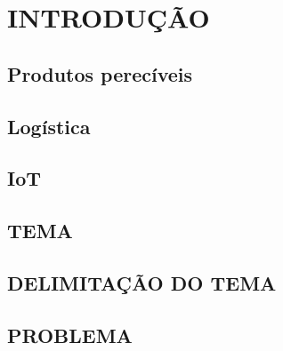 \chapter{INTRODUÇÃO}\label{cap:introducao}


\section{Produtos perecíveis}


\section{Logística}


\section{IoT}

\section{TEMA} 


\section{DELIMITAÇÃO DO TEMA} 


\section{PROBLEMA}


